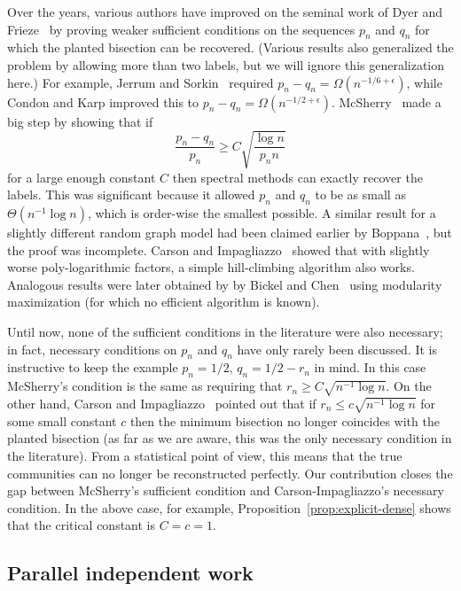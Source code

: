 \documentclass[EJP]{ejpecp}
\newcommand{\1}[1]{\mathbbm{1}_{\{#1\}}}
\begin{document}
Over the years, various authors have
improved on the seminal work of Dyer and Frieze~\cite{DF:89}
by proving weaker sufficient conditions on the sequences $p_n$ and $q_n$
for which the planted bisection
can be recovered. (Various results also generalized the problem by allowing
more than two labels, but we will ignore this generalization here.)
For example, Jerrum and Sorkin~\cite{JS:98}
required $p_n - q_n = \Omega(n^{-1/6 + \epsilon})$, while Condon and Karp
improved this to $p_n - q_n = \Omega(n^{-1/2 + \epsilon})$.
McSherry~\cite{M:01} made a big step by showing that if
\[
\frac{p_n-q_n}{p_n} \geq C \sqrt{\frac{\log n}{p_n n}}
\]
for a large enough constant $C$ then spectral methods can exactly recover the labels.
This was significant because it allowed $p_n$ and $q_n$ to be as small as $\Theta(n^{-1} \log n)$,
which is order-wise the smallest possible.
A similar result for a slightly different random graph model had
been claimed earlier by Boppana~\cite{B:87}, but the proof was incomplete.
Carson and Impagliazzo~\cite{CI:01} showed that with slightly worse poly-logarithmic factors,
a simple hill-climbing algorithm also works.
Analogous results were later obtained by by Bickel and Chen~\cite{BC:09} using
modularity maximization (for which no efficient algorithm is known).

Until now, none of the sufficient conditions in the literature
were also necessary; in fact, necessary conditions on $p_n$ and $q_n$
have only rarely been discussed.
It is instructive to keep the example $p_n=1/2$, $q_n = 1/2-r_n$ in mind. In this case
McSherry's condition is the same as requiring that
$r_n \geq C \sqrt{n^{-1} \log n}$.
On the other hand, Carson and Impagliazzo~\cite{CI:01} pointed out that if $r_n \le c \sqrt{n^{-1} \log n}$ for
some small constant $c$ then the minimum bisection no longer coincides with the planted bisection (as far as we are aware, this was the only necessary
condition in the literature).
From a statistical point of view, this means that the true communities can no longer be reconstructed
perfectly. Our contribution closes the gap between McSherry's sufficient condition and
Carson-Impagliazzo's necessary condition. In the above case, for example,
Proposition~\ref{prop:explicit-dense} shows that the critical
constant is $C = c = 1$.

\subsection{Parallel independent work}
\end{document}
